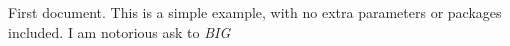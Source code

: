 \documentclass{article}
\begin{document}
First document. This is a simple example, with no 
extra parameters or packages included.
I am notorious ask to \emph{BIG}
\end{document}
